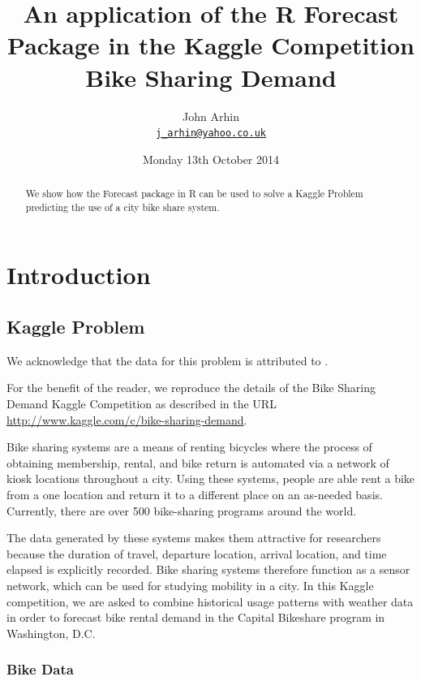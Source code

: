 \documentclass{article}
\begin{document}
\title{An application of the R Forecast Package in the Kaggle Competition Bike Sharing Demand}
\author{John Arhin\\
\texttt{\href{mailto:j_arhin@yahoo.co.uk}{j\_arhin@yahoo.co.uk}}}
\date{Monday 13th October 2014}
\maketitle

\begin{abstract}
 We show how the Forecast package in R can be used to solve a Kaggle Problem predicting the use of a city bike share system.
\end{abstract}


\section{Introduction}
\subsection{Kaggle Problem}

We acknowledge that the data for this problem is attributed to \cite{RProj}. 

For the benefit of the reader, we reproduce the details of the Bike Sharing Demand Kaggle Competition as described in the URL \url{http://www.kaggle.com/c/bike-sharing-demand}.

Bike sharing systems are a means of renting bicycles where the process of obtaining membership, rental, and bike return is automated via a network of kiosk locations throughout a city. Using these systems, people are able rent a bike from a one location and return it to a different place on an as-needed basis. Currently, there are over 500 bike-sharing programs around the world.

The data generated by these systems makes them attractive for researchers because the duration of travel, departure location, arrival location, and time elapsed is explicitly recorded. Bike sharing systems therefore function as a sensor network, which can be used for studying mobility in a city. In this Kaggle competition, we are asked to combine historical usage patterns with weather data in order to forecast bike rental demand in the Capital Bikeshare program in Washington, D.C.

\subsubsection{Bike Data}
\end{document}
